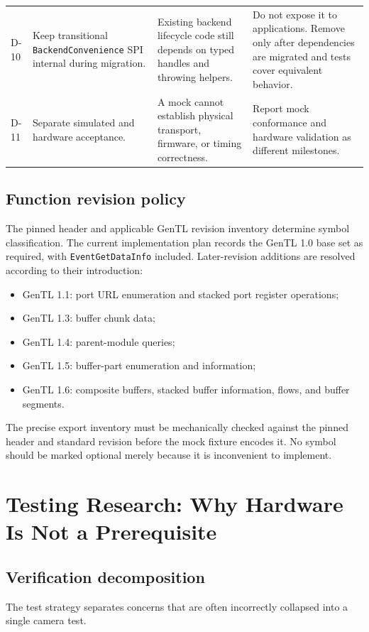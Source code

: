 \documentclass[11pt,a4paper]{report}
\begin{document}
\begin{longtable}{p{}p{}p{}p{}}
D-10 & Keep transitional \texttt{BackendConvenience} SPI internal during migration. & Existing backend lifecycle code still depends on typed handles and throwing helpers. & Do not expose it to applications. Remove only after dependencies are migrated and tests cover equivalent behavior. \\
D-11 & Separate simulated and hardware acceptance. & A mock cannot establish physical transport, firmware, or timing correctness. & Report mock conformance and hardware validation as different milestones. \\
\bottomrule
\end{longtable}

\section{Function revision policy}
The pinned header and applicable GenTL revision inventory determine symbol classification. The current implementation plan records the GenTL 1.0 base set as required, with \texttt{EventGetDataInfo} included. Later-revision additions are resolved according to their introduction:
\begin{itemize}
  \item GenTL 1.1: port URL enumeration and stacked port register operations;
  \item GenTL 1.3: buffer chunk data;
  \item GenTL 1.4: parent-module queries;
  \item GenTL 1.5: buffer-part enumeration and information;
  \item GenTL 1.6: composite buffers, stacked buffer information, flows, and buffer segments.
\end{itemize}
The precise export inventory must be mechanically checked against the pinned header and standard revision before the mock fixture encodes it. No symbol should be marked optional merely because it is inconvenient to implement.

\chapter{Testing Research: Why Hardware Is Not a Prerequisite}

\section{Verification decomposition}
The test strategy separates concerns that are often incorrectly collapsed into a single camera test.
\end{document}
